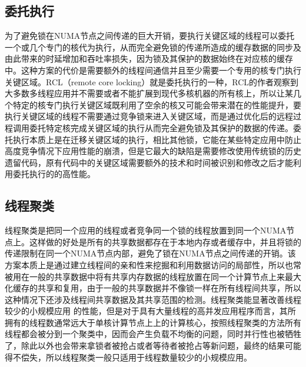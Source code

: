 \subsection{委托执行}
为了避免锁在NUMA节点之间传递的巨大开销，要执行关键区域的线程可以委托一个或几个专门的核代为执行\cite{oyama1999executing}\cite{lozi2012remote}\cite{fatourou2012revisiting}\cite{hendler2010flat}\cite{guiroux2016multicore}，从而完全避免锁的传递所造成的缓存数据的同步及由此带来的时延增加和吞吐率损失，因为锁及其保护的数据始终在对应核的缓存中。这种方案的代价是需要额外的线程间通信并且至少需要一个专用的核专门执行关键区域。RCL（remote core locking）\cite{lozi2012remote}就是委托执行的一种，RCL的作者观察到大多数多线程应用并不需要或者不能扩展到现代多核机器的所有核上，所以让某几个特定的核专门执行关键区域既利用了空余的核又可能会带来潜在的性能提升，要执行关键区域的线程不需要通过竞争锁来进入关键区域，而是通过优化后的远程过程调用委托特定核完成关键区域的执行从而完全避免锁及其保护的数据的传递。委托执行本质上是在迁移关键区域的执行，相比其他锁，它能在某些特定应用中防止高度竞争情况下应用性能的崩溃，但是它最大的缺陷是需要修改使用传统锁的历史遗留代码，原有代码中的关键区域需要额外的技术和时间被识别和修改之后才能利用委托执行的的高性能。

\subsection{线程聚类}
线程聚类是把同一个应用的线程或者竞争同一个锁的线程放置到同一个NUMA节点上\cite{tam2007thread}\cite{thekkath1994impact}\cite{xian2008contention}。这样做的好处是所有的共享数据都存在于本地内存或者缓存中，并且将锁的传递限制在同一个NUMA节点内部，避免了锁在NUMA节点之间传递的开销。该方案本质上是通过建立线程间的亲和性来挖掘和利用数据访问的局部性，所以也常被用在一般的共享数据中将有共享内存数据的线程放置在同一个计算节点上来最大化缓存的共享和复用，由于一般的共享数据并不像锁一样在所有线程间共享，所以这种情况下还涉及线程间共享数据及其共享范围的检测。线程聚类能显著改善线程较少的小规模应用
的性能，但是对于具有大量线程的高并发应用程序而言，其所拥有的线程数通常远大于单核计算节点上上的计算核心，按照线程聚类的方法所有线程都会被分到一个聚类中，因而会产生负载不均衡的问题，同时并行性也被牺牲了，除此以外也会带来拿锁者被抢占或者等待者被抢占等新问题，最终的结果可能得不偿失，所以线程聚类一般只适用于线程数量较少的小规模应用。

